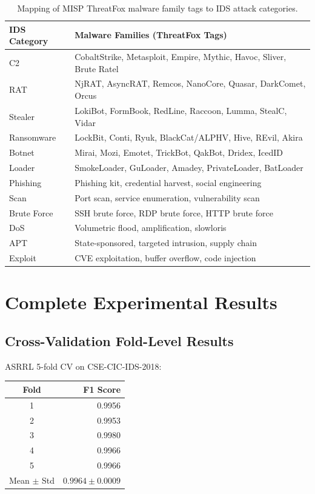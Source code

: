 \documentclass[12pt, letterpaper, oneside]{report}
\newcommand{\ASRRL}{\textsc{ASRRL}}
\begin{document}
\begin{appendices}
\begin{table}[htbp]
\centering
\caption{Mapping of MISP ThreatFox malware family tags to IDS attack categories.}
\label{tab:misp_tags}
\small
\begin{tabular}{ll}
\toprule
\textbf{IDS Category} & \textbf{Malware Families (ThreatFox Tags)} \\
\midrule
C2 & CobaltStrike, Metasploit, Empire, Mythic, Havoc, Sliver, Brute Ratel \\
RAT & NjRAT, AsyncRAT, Remcos, NanoCore, Quasar, DarkComet, Orcus \\
Stealer & LokiBot, FormBook, RedLine, Raccoon, Lumma, StealC, Vidar \\
Ransomware & LockBit, Conti, Ryuk, BlackCat/ALPHV, Hive, REvil, Akira \\
Botnet & Mirai, Mozi, Emotet, TrickBot, QakBot, Dridex, IcedID \\
Loader & SmokeLoader, GuLoader, Amadey, PrivateLoader, BatLoader \\
Phishing & Phishing kit, credential harvest, social engineering \\
Scan & Port scan, service enumeration, vulnerability scan \\
Brute Force & SSH brute force, RDP brute force, HTTP brute force \\
DoS & Volumetric flood, amplification, slowloris \\
APT & State-sponsored, targeted intrusion, supply chain \\
Exploit & CVE exploitation, buffer overflow, code injection \\
\bottomrule
\end{tabular}
\end{table}


\chapter{Complete Experimental Results}
\label{app:full_results}

\section{Cross-Validation Fold-Level Results}

\ASRRL{} 5-fold CV on CSE-CIC-IDS-2018:
\begin{center}
\begin{tabular}{cr}
\toprule
\textbf{Fold} & \textbf{F1 Score} \\
\midrule
1 & 0.9956 \\
2 & 0.9953 \\
3 & 0.9980 \\
4 & 0.9966 \\
5 & 0.9966 \\
\midrule
Mean $\pm$ Std & $0.9964 \pm 0.0009$ \\
\bottomrule
\end{tabular}
\end{center}


\end{appendices}
\end{document}
